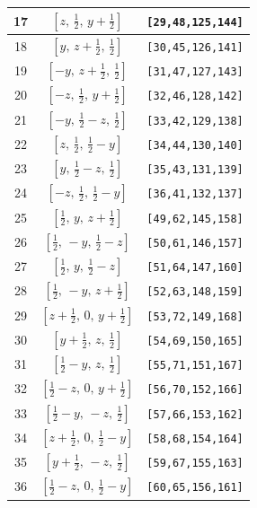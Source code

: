 \documentclass[fleqn,8pt]{jsarticle}
\begin{document}
\begin{longtable}{ccc}
17 & $\left[ z,\, \frac{1}{2},\, y + \frac{1}{2} \right]$ & {\tt [29,48,125,144]} \\ \hline
18 & $\left[ y,\, z + \frac{1}{2},\, \frac{1}{2} \right]$ & {\tt [30,45,126,141]} \\ \hline
19 & $\left[ - y,\, z + \frac{1}{2},\, \frac{1}{2} \right]$ & {\tt [31,47,127,143]} \\ \hline
20 & $\left[ - z,\, \frac{1}{2},\, y + \frac{1}{2} \right]$ & {\tt [32,46,128,142]} \\ \hline
21 & $\left[ - y,\, \frac{1}{2} - z,\, \frac{1}{2} \right]$ & {\tt [33,42,129,138]} \\ \hline
22 & $\left[ z,\, \frac{1}{2},\, \frac{1}{2} - y \right]$ & {\tt [34,44,130,140]} \\ \hline
23 & $\left[ y,\, \frac{1}{2} - z,\, \frac{1}{2} \right]$ & {\tt [35,43,131,139]} \\ \hline
24 & $\left[ - z,\, \frac{1}{2},\, \frac{1}{2} - y \right]$ & {\tt [36,41,132,137]} \\ \hline
25 & $\left[ \frac{1}{2},\, y,\, z + \frac{1}{2} \right]$ & {\tt [49,62,145,158]} \\ \hline
26 & $\left[ \frac{1}{2},\, - y,\, \frac{1}{2} - z \right]$ & {\tt [50,61,146,157]} \\ \hline
27 & $\left[ \frac{1}{2},\, y,\, \frac{1}{2} - z \right]$ & {\tt [51,64,147,160]} \\ \hline
28 & $\left[ \frac{1}{2},\, - y,\, z + \frac{1}{2} \right]$ & {\tt [52,63,148,159]} \\ \hline
29 & $\left[ z + \frac{1}{2},\, 0,\, y + \frac{1}{2} \right]$ & {\tt [53,72,149,168]} \\ \hline
30 & $\left[ y + \frac{1}{2},\, z,\, \frac{1}{2} \right]$ & {\tt [54,69,150,165]} \\ \hline
31 & $\left[ \frac{1}{2} - y,\, z,\, \frac{1}{2} \right]$ & {\tt [55,71,151,167]} \\ \hline
32 & $\left[ \frac{1}{2} - z,\, 0,\, y + \frac{1}{2} \right]$ & {\tt [56,70,152,166]} \\ \hline
33 & $\left[ \frac{1}{2} - y,\, - z,\, \frac{1}{2} \right]$ & {\tt [57,66,153,162]} \\ \hline
34 & $\left[ z + \frac{1}{2},\, 0,\, \frac{1}{2} - y \right]$ & {\tt [58,68,154,164]} \\ \hline
35 & $\left[ y + \frac{1}{2},\, - z,\, \frac{1}{2} \right]$ & {\tt [59,67,155,163]} \\ \hline
36 & $\left[ \frac{1}{2} - z,\, 0,\, \frac{1}{2} - y \right]$ & {\tt [60,65,156,161]} \\ \hline

\end{longtable}
\end{document}
